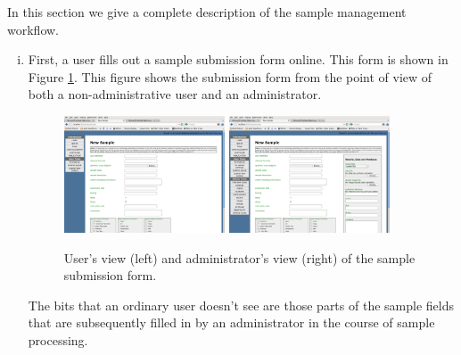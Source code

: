\documentclass[12pt,twoside]{article}
\begin{document}
In this section we give a complete description of the sample management
workflow.
\begin{enumerate}[(i)]
\item
First, a user fills out a sample submission form online. This form is
shown in Figure \ref{fig:sampleform}. This figure shows the
submission form from the point of view of both a non-administrative user
and an administrator.
\begin{figure}[!htb]
\begin{center}
\includegraphics[width=0.45\textwidth]{sampleformuser}
\quad
\includegraphics[width=0.45\textwidth]{sampleformadmin}
\caption{User's view (left) and administrator's view (right)
of the sample submission form.\label{fig:sampleform}}
\end{center}
\end{figure}

The bits that an ordinary user doesn't see are those parts of the sample
fields that are subsequently filled in by an administrator in the course
of sample processing.


\end{enumerate}
\end{document}
